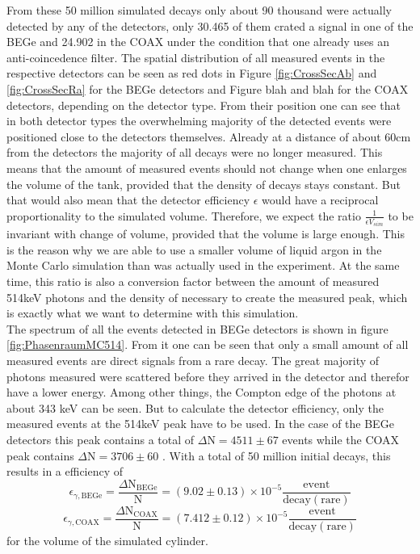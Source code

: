 From these 50 million simulated decays only about 90 thousand were actually detected by any of the detectors, only 30.465 of them crated a signal in one of the BEGe and 24.902 in the COAX under the condition that one already uses an anti-coincedence filter.
The spatial distribution of all measured events in the respective detectors can be seen as red dots in Figure \ref{fig:CrossSecAb} and \ref{fig:CrossSecRa} for the BEGe detectors and Figure blah and blah for the COAX detectors, depending on the detector type.
From their position one can see that in both detector types the overwhelming majority of the detected events were positioned close to the detectors themselves.
Already at a distance of about 60cm from the detectors the majority of all decays were no longer measured.
This means that the amount of measured events should not change when one enlarges the volume of the tank, provided that the density of decays stays constant.
But that would also mean that the detector efficiency $\epsilon$ would have a reciprocal proportionality to the simulated volume.
Therefore, we expect the ratio $\frac{1}{\epsilon V_{sim}}$ to be invariant with change of volume, provided that the volume is large enough.   
This is the reason why we are able to use a smaller volume of liquid argon in the Monte Carlo simulation than was actually used in the experiment.
At the same time, this ratio is also a conversion factor between the amount of measured 514keV photons and the density of \Kr necessary to create the measured peak, which is exactly what we want to determine with this simulation.
\\

The spectrum of all the events detected in BEGe detectors is shown in figure \ref{fig:PhasenraumMC514}.
From it one can be seen that only a small amount of all measured events are direct signals from a rare \Kr decay. 
The great majority of photons measured were scattered before they arrived in the detector and therefor have a lower energy.
Among other things, the Compton edge of the photons at about 343 keV can be seen.
But to calculate the detector efficiency, only the measured events at the 514keV peak have to be used.
In the case of the BEGe detectors this peak contains a total of \(\Delta\mathrm{N} = 4511\pm67\) events while the COAX peak contains  \(\Delta\mathrm{N} = 3706\pm60\) .
With a total of 50 million initial decays, this results in a efficiency of 
\begin{equation*}
\epsilon_{\gamma\mathrm{,BEGe}} = \frac{\Delta\mathrm{N_{BEGe}}}{\mathrm{N}} = (9.02\pm0.13) \times 10^{-5}  \frac{\mathrm{event}}{\mathrm{decay(rare)}}
\end{equation*}
\begin{equation*}
\epsilon_{\gamma\mathrm{,COAX}} = \frac{\Delta\mathrm{N_{COAX}}}{\mathrm{N}} = (7.412\pm0.12) \times 10^{-5}  \frac{\mathrm{event}}{\mathrm{decay(rare)}}
\end{equation*}
for the volume of the simulated cylinder.
\\

